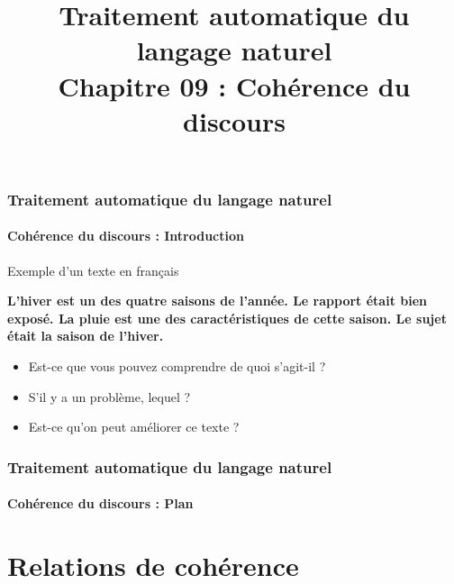 \documentclass[xcolor=table]{beamer}
\title[TALN : 09- Cohérence du discours]%
{Traitement automatique du langage naturel\\Chapitre 09 : Cohérence du discours}
\begin{document}
	
\begin{frame}
\frametitle{Traitement automatique du langage naturel}
\framesubtitle{Cohérence du discours : Introduction}

\begin{exampleblock}{Exemple d'un texte en français}
	\begin{center}
		\Large\bfseries
		L'hiver est un des quatre saisons de l'année. 
		Le rapport était bien exposé. 
		La pluie est une des caractéristiques de cette saison.
		Le sujet était la saison de l'hiver.
	\end{center}
\end{exampleblock}

\begin{itemize}
	\item Est-ce que vous pouvez comprendre de quoi s'agit-il ?
	\item S'il y a un problème, lequel ?
	\item Est-ce qu'on peut améliorer ce texte ?
\end{itemize}

\end{frame}

%
%

\begin{frame}
\frametitle{Traitement automatique du langage naturel}
\framesubtitle{Cohérence du discours : Plan}

\begin{multicols}{2}
\tableofcontents
\end{multicols}
\end{frame}

\section{Relations de cohérence}
\end{document}
